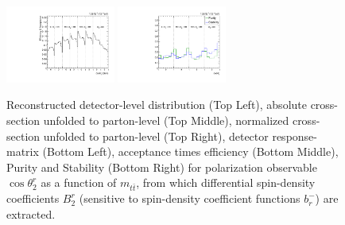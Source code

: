 \begin{figure}[htb]
\begin{center}
 \includegraphics[width=0.32\textwidth]{fig_fullRun2UL/unfolding/combined/TotEff_b2r_mttbar.pdf}
 \includegraphics[width=0.32\textwidth]{fig_fullRun2UL/unfolding/combined/PurStab_b2r_mttbar.pdf} \\
\caption{Reconstructed detector-level distribution (Top Left), absolute cross-section unfolded to parton-level (Top Middle), normalized cross-section unfolded to parton-level (Top Right), detector response-matrix (Bottom Left), acceptance times efficiency (Bottom Middle), Purity and Stability (Bottom Right) for polarization observable $\cos\theta_{2}^{r}$ as a function of $m_{t\bar{t}}$, from which differential spin-density coefficients $B_{2}^{r}$ (sensitive to spin-density coefficient functions $b_r^{-}$) are extracted.}
\label{fig:b2r_mttbar}
\end{center}
\end{figure}
\clearpage
